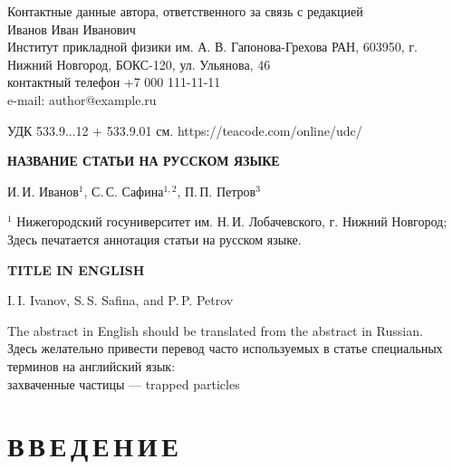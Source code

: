 \documentclass[12pt, a4paper]{article}
\begin{document}
\thispagestyle{empty}

Контактные данные автора, ответственного за связь с редакцией\\
Иванов Иван Иванович\\
Институт прикладной физики им. А. В. Гапонова-Грехова РАН, 603950, г. Нижний Новгород, БОКС-120, ул. Ульянова, 46\\
контактный телефон +7 000 111-11-11\\
e-mail: author@example.ru

\newpage
\setcounter{page}{1}

УДК 533.9...12 + 533.9.01  см. https://teacode.com/online/udc/

{\large\bf НАЗВАНИЕ СТАТЬИ НА РУССКОМ ЯЗЫКЕ}

И.\,И. Иванов$^1$, С.\,С. Сафина$^{1,2}$, П.\,П. Петров$^3$

$^1$ Нижегородский госуниверситет им. Н.\,И. Лобачевского, г. Нижний Новгород;\\


Здесь печатается аннотация статьи на русском языке.

\newpage

{\large\bf TITLE IN ENGLISH}

I.\,I. Ivanov, S.\,S. Safina, and P.\,P. Petrov

The abstract in English should be translated from the abstract in Russian.\\

Здесь желательно привести перевод часто используемых в статье специальных терминов на английский язык:\\
захваченные частицы --- trapped particles

\newpage

\section*{В\,В\,Е\,Д\,Е\,Н\,И\,Е}
\end{document}
